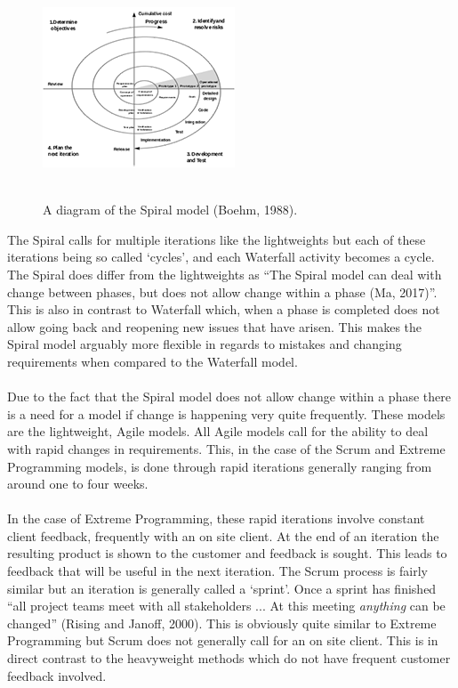 \documentclass{CRPITStyle}
\begin{document}
		 \begin{figure}
		  \includegraphics{spiral1}\\
		  ~\\
		  \caption{\protect\label{spiral} A diagram of the Spiral model (Boehm, 1988).}
		  \end{figure}
		The Spiral calls for multiple iterations like the lightweights but each of these iterations being so called `cycles', and each Waterfall
		activity becomes a cycle. The Spiral does differ from the lightweights as ``The Spiral model can deal with change between phases, but does not allow change within a phase (Ma, 2017)''. This is also in contrast to Waterfall which, when a phase is completed does not allow going back and reopening new issues that have arisen. This makes the Spiral model arguably more flexible in regards to mistakes and changing requirements when compared to the Waterfall model.\\
		~\\
		Due to the fact that the Spiral model does not allow change within a phase there is a need for a model if change is happening very quite frequently. These models are the lightweight, Agile models. All Agile models call for the ability to deal with rapid changes in requirements. This, in the case of the Scrum and Extreme Programming models, is done through rapid iterations generally ranging from around one to four weeks. \\
		~\\
		In the case of Extreme Programming, these rapid iterations involve constant client feedback, frequently with an on site client. At the end of an iteration the resulting product is shown to the customer and feedback is sought. This leads to feedback that will be useful in the next iteration. The Scrum process is fairly similar but an iteration is generally called a `sprint'. Once a sprint has finished ``all project teams meet with all stakeholders ... At this meeting \textit{anything} can be changed'' (Rising and Janoff, 2000). This is obviously quite similar to Extreme Programming but Scrum does not generally call for an on site client. This is in direct contrast to the heavyweight methods which do not have frequent customer feedback involved.\\
\end{document}
